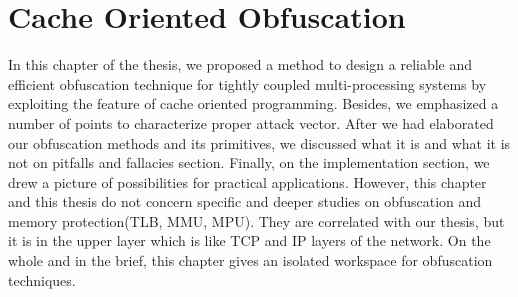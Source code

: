 \chapter{Cache Oriented Obfuscation}

In this chapter of the thesis, we proposed a method to design a reliable and efficient obfuscation technique for tightly coupled multi-processing systems by exploiting the feature of cache oriented programming. Besides, we emphasized a number of points to characterize proper attack vector. After we had elaborated our obfuscation methods and its primitives, we discussed what it is and what it is not on pitfalls and fallacies section. Finally, on the implementation section, we drew a picture of possibilities for practical applications. However, this chapter and this thesis do not concern specific and deeper studies on obfuscation and memory protection(TLB, MMU, MPU). They are correlated with our thesis, but it is in the upper layer which is like TCP and IP layers of the network. On the whole and in the brief, this chapter gives an isolated workspace for obfuscation techniques.


